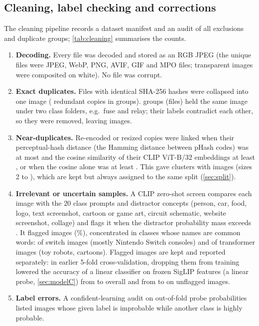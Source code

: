 \documentclass[11pt,a4paper]{article}
\newcommand{\cls}[1]{#1}
\begin{document}
\subsection{Cleaning, label checking and corrections}\label{sec:cleaning}
The cleaning pipeline records a dataset manifest and an audit of all exclusions and duplicate groups;
\cref{tab:cleaning} summarises the counts.
\begin{enumerate}[leftmargin=*]
\item \textbf{Decoding.} Every file was decoded and stored as an RGB JPEG (the unique files were \nJPEG JPEG,
\nWEBP WebP, \nPNG PNG, \nAVIF AVIF, \nGIF GIF and \nMPO MPO files; \nAlpha transparent images were composited on
white). No file was corrupt.
\item \textbf{Exact duplicates.} Files with identical SHA-256 hashes were collapsed into one image (\nDupRedundant
redundant copies in \nDupGroups groups). \nConflictGroups groups (\nConflictFiles files) held the same image under two
class folders, e.g.\ \cls{fuse} and \cls{relay}; their labels contradict each other, so they were removed,
leaving \nRows images.
\item \textbf{Near-duplicates.} Re-encoded or resized copies were linked when their perceptual-hash distance (the
Hamming distance between pHash codes) was at most \phashRadius and the cosine similarity of their CLIP ViT-B/32
\citep{radford2021clip} embeddings at least \cosWithPhash, or when the cosine alone was at least \cosOnly. This gave \nNearDupClusters clusters with \nNearDupRows images (sizes 2 to \maxClusterSize), which are
kept but always assigned to the same split (\cref{sec:split}).
\item \textbf{Irrelevant or uncertain samples.} A CLIP zero-shot screen compares each image with the 20 class prompts
and \nDistractors distractor concepts (person, car, food, logo, text screenshot, cartoon or game art, circuit
schematic, website screenshot, collage) and flags it when the distractor probability mass exceeds \oodThreshold. It
flagged \nOOD images (\pctOOD\%), concentrated in classes whose names are common words: \nSwitchOOD of \nSwitch
\cls{switch} images (mostly Nintendo Switch consoles) and \nTransformerOOD of \nTransformer \cls{transformer} images
(toy robots, cartoons). Flagged images are kept and reported separately: in earlier 5-fold cross-validation,
dropping them from training lowered the accuracy of a linear classifier on frozen SigLIP features (a linear
probe, \cref{sec:modelC}) from \abKeepAcc to \abDropAcc overall and from \abKeepIn to \abDropIn on unflagged images.
\item \textbf{Label errors.} A confident-learning audit \citep{northcutt2021confident} on out-of-fold probe
probabilities listed \nLabelIssues images whose given label is improbable while another class is highly probable.
\end{enumerate}
\end{document}
